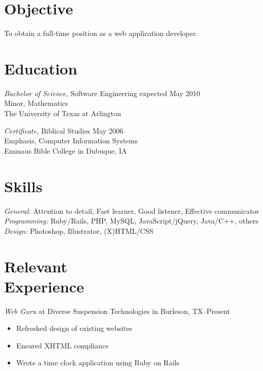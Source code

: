 \documentclass[margin]{res}
\begin{document}
\begin{resume}

\section{\textsf{Objective}} 

                To obtain a full-time position as a web application developer.

\section{\textsf{Education}}

                {\sl Bachelor of Science,} Software Engineering \dotfill expected May 2010\\
								Minor, Mathematics \\
                The University of Texas at Arlington
                
                {\sl Certificate,} Biblical Studies \dotfill May 2006 \\
                Emphasis, Computer Information Systems\\
                Emmaus Bible College in Dubuque, IA


\section{\textsf{Skills}}

                {\sl General:} Attention to detail, Fast learner, Good listener, Effective communicator  \\
                {\sl Programming:} Ruby/Rails, PHP, MySQL, JavaScript/jQuery, Java/C++, others \\
                {\sl Design:} Photoshop, Illustrator, (X)HTML/CSS \\


\section{\textsf{Relevant \\ Experience}} 
                
                {\sl Web Guru}
                 at Diverse Suspension Technologies in Burleson, TX--Present
                 \begin{itemize} \itemsep -2pt %
                   \item Refreshed design of existing websites
                   \item Ensured XHTML compliance
                   \item Wrote a time clock application using Ruby on Rails
                \end{itemize}
                

\end{resume}
\end{document}
